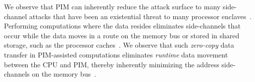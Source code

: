 We observe that PIM can inherently reduce the attack surface to many side-channel attacks that have been an existential threat to many processor enclaves~\cite{sgx-cache-attack,leaky-cauldron,sgx-page-table}. Performing computations where the data resides eliminates side-channels that occur while the data moves in a route on the memory bus or stored in shared storage, such as the processor caches~\cite{sgx-cache-attack}. We observe that such \emph{zero-copy} data transfer in PIM-assisted computations eliminates \emph{runtime} data movement between the CPU and PIM, thereby inherently minimizing the address side-channels on the memory bus~\cite{drama,membuster}. 






